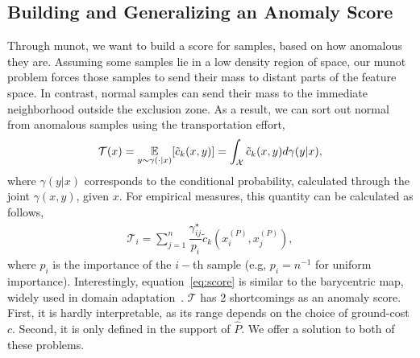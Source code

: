 \subsection{Building and Generalizing an Anomaly Score}\label{sec:building-anomaly-score}

Through \gls{munot}, we want to build a score for samples, based on how anomalous they are. Assuming some samples lie in a low density region of space, our \gls{munot} problem forces those samples to send their mass to distant parts of the feature space. In contrast, normal samples can send their mass to the immediate neighborhood outside the exclusion zone. As a result, we can sort out normal from anomalous samples using the transportation effort,
\begin{align*}
    \mathcal{T}(x) = \underset{y \sim \gamma(\cdot|x)}{\mathbb{E}}[\tilde{c}_{k}(x,y)] = \int_{\mathcal{X}}\tilde{c}_{k}(x, y)d\gamma(y|x),
\end{align*}
where $\gamma(y|x)$ corresponds to the conditional probability, calculated through the joint $\gamma(x, y)$, given $x$. For empirical measures, this quantity can be calculated as follows,
\begin{align}
    \mathcal{T}_{i} = \sum_{j=1}^{n}\dfrac{\gamma_{ij}^{\star}}{p_{i}}\tilde{c}_{k}(x_{i}^{(P)}, x_{j}^{(P)}),\label{eq:score}
\end{align}
where $p_{i}$ is the importance of the $i-$th sample (e.g, $p_{i} = n^{-1}$ for uniform importance). Interestingly, equation~\ref{eq:score} is similar to the barycentric map, widely used in domain adaptation~\cite{courty2016optimal, montesuma2023multi}. $\mathcal{T}$ has 2 shortcomings as an anomaly score. First, it is hardly interpretable, as its range depends on the choice of ground-cost $c$. Second, it is only defined in the support of $\hat{P}$. We offer a solution to both of these problems.

